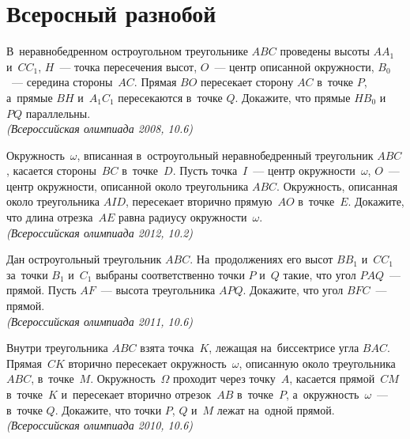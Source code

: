 

\section*{Всеросный разнобой}


\begin{problems}

\item
В~неравнобедренном остроугольном треугольнике $ABC$ проведены высоты
$A A_1$ и~$C C_1$, $H$~--- точка пересечения высот, $O$~--- центр описанной
окружности, $B_0$~--- середина стороны~$AC$.
Прямая $BO$ пересекает сторону $AC$ в~точке $P$, а~прямые $BH$ и~$A_1C_1$
пересекаются в~точке $Q$.
Докажите, что прямые $HB_0$ и~$PQ$ параллельны.
\\\emph{(Всероссийская олимпиада 2008, 10.6)}

\item
Окружность~$\omega$, вписанная в~остроугольный неравнобедренный треугольник
$ABC$, касается стороны~$BC$ в~точке~$D$.
Пусть точка~$I$~--- центр окружности~$\omega$, $O$~--- центр окружности,
описанной около треугольника $ABC$.
Окружность, описанная около треугольника $AID$, пересекает вторично прямую~$AO$
в~точке~$E$.
Докажите, что длина отрезка~$AE$ равна радиусу окружности~$\omega$.
\\\emph{(Всероссийская олимпиада 2012, 10.2)}

\item
Дан остроугольный треугольник $ABC$.
На~продолжениях его высот $B B_1$ и~$C C_1$ за~точки $B_1$ и~$C_1$ выбраны
соответственно точки $P$ и~$Q$ такие, что угол $PAQ$~--- прямой.
Пусть $AF$~--- высота треугольника $APQ$.
Докажите, что угол $BFC$~--- прямой.
\\\emph{(Всероссийская олимпиада 2011, 10.6)}

\item
Внутри треугольника $ABC$ взята точка~$K$, лежащая на~биссектрисе угла $BAC$.
Прямая~$CK$ вторично пересекает окружность~$\omega$, описанную около
треугольника $ABC$, в~точке~$M$.
Окружность~$\Omega$ проходит через точку~$A$, касается прямой~$CM$ в~точке~$K$
и~пересекает вторично отрезок~$AB$ в~точке~$P$, а~окружность~$\omega$~---
в~точке $Q$.
Докажите, что точки $P$, $Q$ и~$M$ лежат на~одной прямой.
\\\emph{(Всероссийская олимпиада 2010, 10.6)}


\end{problems}

